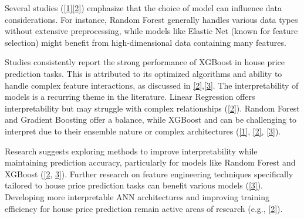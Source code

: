 \documentclass[a4paper, 12pt]{article}
\begin{document}
Several studies (\href{https://www.ijcsma.com/articles/literature-review-on-real-estate-value-prediction-using-machine-learning.pdf}{[1]}\href{https://rspsciencehub.com/article_23797.html}{[2]}) emphasize that the choice of model can influence data considerations. For instance, Random Forest generally handles various data types without extensive preprocessing, while models like Elastic Net (known for feature selection) might benefit from high-dimensional data containing many features.

Studies consistently report the strong performance of XGBoost in house price prediction tasks. This is attributed to its optimized algorithms and ability to handle complex feature interactions, as discussed in \href{https://rspsciencehub.com/article_23797.html}{[2]},\href{https://www.researchgate.net/publication/350810698_Prediction_of_House_Price_Using_XGBoost_Regression_Algorithm}{[3]}. The interpretability of models is a recurring theme in the literature. Linear Regression offers interpretability but may struggle with complex relationships (\href{https://rspsciencehub.com/article_23797.html}{[2]}). Random Forest and Gradient Boosting offer a balance, while XGBoost and can be challenging to interpret due to their ensemble nature or complex architectures (\href{https://www.ijcsma.com/articles/literature-review-on-real-estate-value-prediction-using-machine-learning.pdf}{[1]}, \href{https://rspsciencehub.com/article_23797.html}{[2]}, \href{https://www.researchgate.net/publication/350810698_Prediction_of_House_Price_Using_XGBoost_Regression_Algorithm}{[3]}).

Research suggests exploring methods to improve interpretability while maintaining prediction accuracy, particularly for models like Random Forest and XGBoost (\href{}{[2}, \href{https://www.researchgate.net/publication/350810698_Prediction_of_House_Price_Using_XGBoost_Regression_Algorithm}{3]}). Further research on feature engineering techniques specifically tailored to house price prediction tasks can benefit various models (\href{https://www.researchgate.net/publication/350810698_Prediction_of_House_Price_Using_XGBoost_Regression_Algorithm}{[3]}). Developing more interpretable ANN architectures and improving training efficiency for house price prediction remain active areas of research (e.g., \href{https://rspsciencehub.com/article_23797.html}{[2]}).
\end{document}

